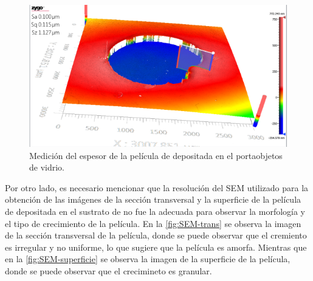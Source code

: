 \documentclass[12pt]{IEEEtran}
\begin{document}
\begin{figure}[htp]
	\centering
	\includegraphics[width=0.8\linewidth]{OP-grosor}
	\caption{Medición del espesor de la película de  depositada en el portaobjetos de vidrio.}
	\label{fig:OP-grosor}
\end{figure}

Por otro lado, es necesario mencionar que la resolución del SEM utilizado para la obtención de las imágenes de la sección transversal y la superficie de la película de  depositada en el sustrato de  no fue la adecuada para observar la morfología y el tipo de crecimiento de la película. En la \cref{fig:SEM-trans} se observa la imagen de la sección transversal de la película, donde se puede observar que el cremiento es irregular y no uniforme, lo que sugiere que la película es amorfa. Mientras que en la \cref{fig:SEM-superficie} se observa la imagen de la superficie de la película, donde se puede observar que el crecimineto es granular.
\end{document}
